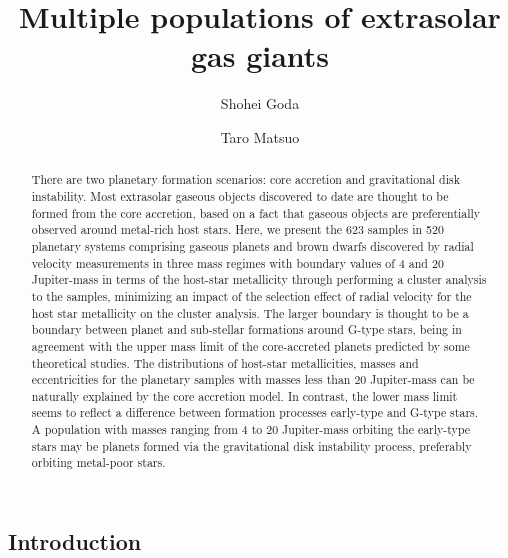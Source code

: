 \documentclass[twocolumn, dvipdfmx]{aastex62}
\begin{document}
\begin{CJK*}{UTF8}{min}

\title{Multiple populations of extrasolar gas giants}

\author{Shohei Goda}

\author{Taro Matsuo}


\begin{abstract}

There are two planetary formation scenarios: core accretion and gravitational disk instability. Most extrasolar gaseous objects discovered to date are thought to be formed from the core accretion, based on a fact that gaseous objects are preferentially observed around metal-rich host stars. Here, we present the 623 samples in 520 planetary systems comprising gaseous planets and brown dwarfs discovered by radial velocity measurements in three mass regimes with boundary values of 4 and 20 Jupiter-mass in terms of the host-star metallicity through performing a cluster analysis to the samples, minimizing an impact of the selection effect of radial velocity for the host star metallicity on the cluster analysis. The larger boundary is thought to be a boundary between planet and sub-stellar formations around G-type stars, being in agreement with the upper mass limit of the core-accreted planets predicted by some theoretical studies. The distributions of host-star metallicities, masses and eccentricities for the planetary samples with masses less than 20 Jupiter-mass can be naturally explained by the core accretion model. In contrast, the lower mass limit seems to reflect a difference between formation processes early-type and G-type stars. A population with masses ranging from 4 to 20 Jupiter-mass orbiting the early-type stars may be planets formed via the gravitational disk instability process, preferably orbiting metal-poor stars.


\end{abstract}

\vspace{1cm}



\section{Introduction} \label{sec:introduction}


\end{CJK*}
\end{document}
